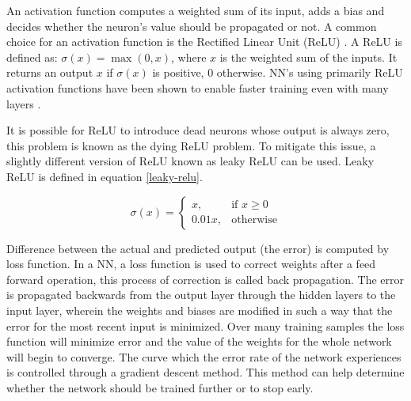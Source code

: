 An activation function computes a weighted sum of its input, adds a bias and decides whether the neuron's value should be propagated or not. A common choice for an activation function is the Rectified Linear Unit (ReLU) \cite{Relu}. A ReLU is defined as: $\sigma(x) = \max(0, x)$, where $x$ is the weighted sum of the inputs. It returns an output $x$ if $\sigma(x)$ is positive, $0$ otherwise. NN's using primarily ReLU activation functions have been shown to enable faster training even with many layers \cite{cnn-star-galaxy}.


It is possible for ReLU to introduce dead neurons whose output is always zero, this problem is known as the dying ReLU problem. To mitigate this issue, a slightly different version of ReLU known as leaky ReLU can be used. Leaky ReLU is defined in equation \ref{leaky-relu}.

\begin{equation}
\sigma(x) =
\begin{cases} \label{leaky-relu}
    x      , & \text{if } x\geq 0\\
    0.01x , & \text{otherwise}
\end{cases}
\end{equation}

Difference between the actual and predicted output (the error) is computed by loss function. In a NN, a loss function is used to correct weights after a feed forward operation, this process of correction is called back propagation. The error is propagated backwards from the output layer through the hidden layers to the input layer, wherein the weights and biases are modified in such a way that the error for the most recent input is minimized. Over many training samples the loss function will minimize error and the value of the weights for the whole network will begin to converge. The curve which the error rate of the network experiences is controlled through a gradient descent method. This method can help determine whether the network should be trained further or to stop early.


